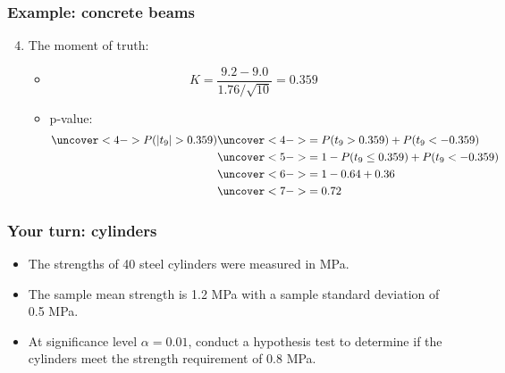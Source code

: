 \documentclass[handout]{beamer}\usepackage{graphicx, color}
\numberwithin{equation}{section}
\begin{document}
\begin{frame}
\frametitle{Example: concrete beams}
\begin{enumerate}
\setcounter{enumi}{3}
\item The moment of truth:
\begin{itemize}
\pause \item \[K = \frac{9.2 -  9.0}{1.76/\sqrt{10}} = 0.359\]
\pause \item  p-value:
\begin{align*}
\uncover<4->{ P(|t_9| > 0.359)} & \uncover<4->{= P(t_9 > 0.359) + P(t_9 < -0.359)} \\
& \uncover<5->{= 1 - P(t_9 \le 0.359) + P(t_9 < -0.359)} \\
&\uncover<6->{= 1 - 0.64 + 0.36} \\
&\uncover<7->{= 0.72}
\end{align*}
\end{itemize}
\end{enumerate}
\end{frame}







\begin{frame}
\frametitle{Your turn: cylinders}
\begin{itemize}
\item The strengths of 40 steel cylinders were measured in MPa. 
\pause \item The sample mean strength is 1.2 MPa with a sample standard deviation of 0.5 MPa.
\pause \item At significance level $\alpha = 0.01$, conduct a hypothesis test to determine if the cylinders meet the strength requirement of 0.8 MPa.
\end{itemize}
\end{frame}
\end{document}
